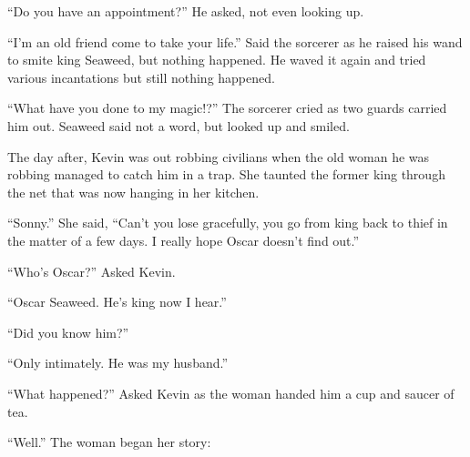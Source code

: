 ``Do you have an appointment?'' He asked, not even looking up.

``I'm an old friend come to take your life.''
Said the sorcerer as he raised his wand to smite king Seaweed, but nothing happened.
He waved it again and tried various incantations but still nothing happened.

``What have you done to my magic!?''
The sorcerer cried as two guards carried him out.
Seaweed said not a word, but looked up and smiled.

\tbreak

The day after, Kevin was out robbing civilians when the old woman he was robbing managed to catch him in a trap. She taunted the former king through the net that was now hanging in her kitchen.

``Sonny.'' She said, ``Can't you lose gracefully, you go from king back to thief in the matter of a few days. I really hope Oscar doesn't find out.''

``Who's Oscar?'' Asked Kevin.

``Oscar Seaweed. He's king now I hear.''

``Did you know him?''

``Only intimately. He was my husband.''

``What happened?'' Asked Kevin as the woman handed him a cup and saucer of tea.

``Well.'' The woman began her story:

